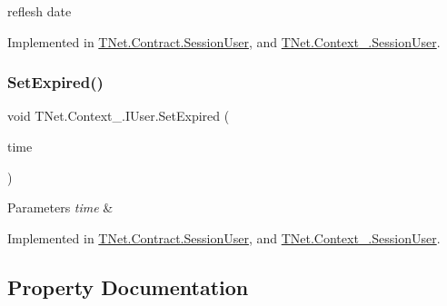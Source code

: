 reflesh date 



Implemented in \mbox{\hyperlink{class_t_net_1_1_contract_1_1_session_user_a972f612fe19d4de10d41824553eb6859}{T\+Net.\+Contract.\+Session\+User}}, and \mbox{\hyperlink{class_t_net_1_1_context___1_1_session_user_acfe0a90009a42462cb59b8963e703736}{T\+Net.\+Context\+\_\+.\+Session\+User}}.

\mbox{\label{interface_t_net_1_1_context___1_1_i_user_a17456df46fa86d2e5626d66493ba8d67}} 
\subsubsection{\texorpdfstring{Set\+Expired()}{SetExpired()}}
{\footnotesize\ttfamily void T\+Net.\+Context\+\_\+.\+I\+User.\+Set\+Expired (\begin{DoxyParamCaption}\item[{Date\+Time}]{time }\end{DoxyParamCaption})}






\begin{DoxyParams}{Parameters}
{\em time} & \\
\hline
\end{DoxyParams}


Implemented in \mbox{\hyperlink{class_t_net_1_1_contract_1_1_session_user_ac875074672d0a372faabe3f9e4b5805b}{T\+Net.\+Contract.\+Session\+User}}, and \mbox{\hyperlink{class_t_net_1_1_context___1_1_session_user_ad0987cd486a8ff474d73b9d9e40a9bf1}{T\+Net.\+Context\+\_\+.\+Session\+User}}.



\subsection{Property Documentation}
\mbox{\label{interface_t_net_1_1_context___1_1_i_user_afc7ce8dbb54aacad3b1e0435fa1eb99d}} 
